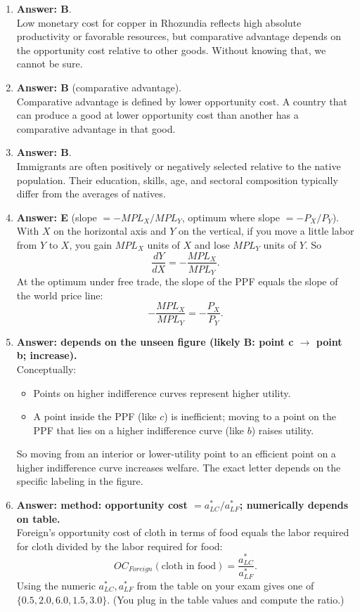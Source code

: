\documentclass[12pt]{article}
\begin{document}
\begin{enumerate}[label=\textbf{\arabic*.}]
\item \textbf{Answer: B}.\\
Low monetary cost for copper in Rhozundia reflects high absolute productivity or favorable resources, but comparative advantage depends on the opportunity cost relative to other goods. Without knowing that, we cannot be sure.

\item \textbf{Answer: B} (comparative advantage).\\
Comparative advantage is defined by lower opportunity cost. A country that can produce a good at lower opportunity cost than another has a comparative advantage in that good.

\item \textbf{Answer: B}.\\
Immigrants are often positively or negatively selected relative to the native population. Their education, skills, age, and sectoral composition typically differ from the averages of natives.

\item \textbf{Answer: E} (slope $=-MPL_X/MPL_Y$, optimum where slope $=-P_X/P_Y$).\\
With $X$ on the horizontal axis and $Y$ on the vertical, if you move a little labor from $Y$ to $X$, you gain $MPL_X$ units of $X$ and lose $MPL_Y$ units of $Y$. So
\[
\frac{dY}{dX} = -\frac{MPL_X}{MPL_Y}.
\]
At the optimum under free trade, the slope of the PPF equals the slope of the world price line:
\[
-\frac{MPL_X}{MPL_Y} = -\frac{P_X}{P_Y}.
\]

\item \textbf{Answer: depends on the unseen figure (likely B: point c $\to$ point b; increase).}\\
Conceptually:
\begin{itemize}
\item Points on higher indifference curves represent higher utility.
\item A point inside the PPF (like $c$) is inefficient; moving to a point on the PPF that lies on a higher indifference curve (like $b$) raises utility.
\end{itemize}
So moving from an interior or lower-utility point to an efficient point on a higher indifference curve increases welfare. The exact letter depends on the specific labeling in the figure.
\newpage
\item \textbf{Answer: method: opportunity cost $= a_{LC}^*/a_{LF}^*$; numerically depends on table.}\\
Foreign’s opportunity cost of cloth in terms of food equals the labor required for cloth divided by the labor required for food:
\[
OC_{Foreign}(\text{cloth in food}) = \frac{a_{LC}^*}{a_{LF}^*}.
\]
Using the numeric $a_{LC}^*,a_{LF}^*$ from the table on your exam gives one of $\{0.5, 2.0, 6.0, 1.5, 3.0\}$. (You plug in the table values and compute the ratio.)

\end{enumerate}
\end{document}
